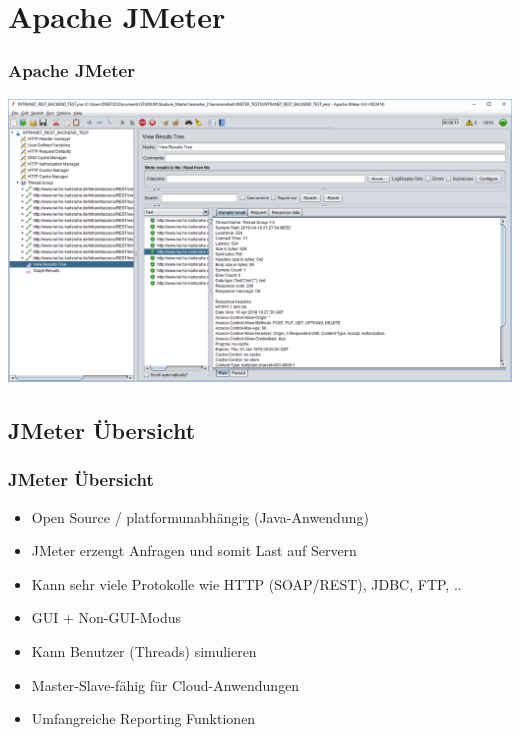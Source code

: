 \documentclass[xcolor=dvipsnames]{beamer}
\begin{document}
\section{Apache JMeter}
\begin{frame}
\frametitle{Apache JMeter}
\begin{center}\includegraphics[width=1\textwidth]{bilder/jmeter_1}
\end{center}
\end{frame}


\subsection{JMeter Übersicht}
\begin{frame}
\frametitle{JMeter Übersicht}

\begin{itemize}
\item Open Source / platformunabhängig (Java-Anwendung)
\item JMeter erzeugt Anfragen und somit Last auf Servern
\item Kann sehr viele Protokolle wie HTTP (SOAP/REST), JDBC, FTP, ..
\item GUI + Non-GUI-Modus
\item Kann Benutzer (Threads) simulieren
\item Master-Slave-fähig für Cloud-Anwendungen
\item Umfangreiche Reporting Funktionen
\end{itemize}
\end{frame}
\end{document}
